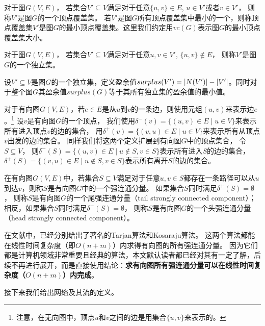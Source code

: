 \begin{definition}[顶点覆盖集]
对于图$G(V, E)$， 若集合$V' \subseteq V$满足对于任意$\{u, v\} \in E$, $u \in V'$或者$v \in V'$， 则称$V'$是图$G$的一个顶点覆盖集。
若$V'$是图$G$所有顶点覆盖集中最小的一个，则称顶点覆盖集$V'$是图$G$的最小顶点覆盖集。这里我们约定用$vc(G)$表示图$G$的最小顶点覆盖集大小。
\end{definition}

\begin{definition}[独立集]
对于图$G(V, E)$， 若集合$V' \subseteq V$满足对于任意$u, v \in V'$, $\{u, v\} \notin E$， 则称$V'$是图$G$的一个独立集。
\end{definition}

设$V' \subseteq V$是图$G$的一个独立集，定义盈余值$surplus(V') = \left\vert N(V') \right\vert - \left\vert V' \right\vert$。同时对于整个图$G$其盈余值$surplus(G)$等于其所有独立集的盈余值的最小值。

对于有向图$G(V, E)$，若$e \in E$是从$u$到$v$的一条边，则使用元组$(u, v)$来表示边$e$。\footnote{注意，在无向图中，顶点$u$和$v$之间的边是用集合$\{u, v\}$来表示的。}
设$v$是有向图$G$的一个顶点， 我们使用$\delta^-(v)=\{(u, v) \in E\;|\;u \in V\}$来表示所有进入顶点$v$的边的集合，
用$\delta^+(v)=\{(v, u) \in E\;|\;u \in V\}$来表示所有从顶点$v$出发的边的集合。
同样我们将这两个定义扩展到有向图$G$中的顶点集合， 令$S \subseteq V$，
则$\delta^-(S)=\{(u, v) \in E\;|\;u \notin S, v \in S\}$表示所有进入$S$的边的集合，
$\delta^+(S)=\{(v, u) \in E\;|\; u \notin S, v \in S\}$表示所有离开$S$的边的集合。

\begin{definition}
在有向图$G(V, E)$中，若集合$S \subseteq V$满足对于任意$u, v \in S$都存在一条路径可以从$u$到达$v$，则称$S$是有向图$G$中的一个强连通分量。
如果集合$S$同时满足$\delta^+(S) = \emptyset$， 则称$S$是有向图$G$的一个尾强连通分量（tail strongly connected component）；
相反，如果集合$S$同时满足$\delta^-(S) = \emptyset$， 则称$S$是有向图$G$的一个头强连通分量（head strongly connected component）。
\end{definition}

在文献\cite{tarjan1972depth,sharir1981strong}中，已经分别给出了著名的Tarjan算法和Kosaraju算法。
这两个算法都能在线性时间复杂度（即$O(n + m)$）内求得有向图的所有强连通分量。
因为它们都是计算机领域非常重要且经典的算法，本文默认读者都已经对其有一定了解，后续不再进行展开，而是直接使用结论：\textbf{求有向图所有强连通分量可以在线性时间复杂度（$O(n + m)$）内完成}。

接下来我们给出网络及其流的定义。


